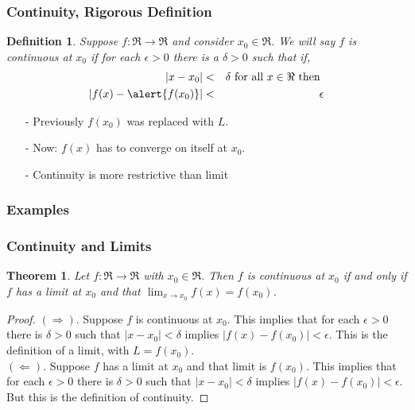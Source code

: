 \documentclass{beamer}
\newtheorem{thm}{Theorem}
\newtheorem{defn}{Definition}
\numberwithin{equation}{section}
\begin{document}
\begin{frame}
\frametitle{Continuity, Rigorous Definition} 

\begin{defn}
Suppose $f:\Re \rightarrow \Re$ and consider $x_{0} \in \Re$.  We will say $f$ is continuous at $x_{0}$ if for each $\epsilon>0$ there is a $\delta>0$ such that if, 
\begin{eqnarray}
|x - x_{0} | & < & \delta \text{ for all  } x \in \Re \text{ then } \nonumber \\
|f(x) - \alert{f(x_{0})}| & < & \epsilon \nonumber 
\end{eqnarray}
\end{defn}

\begin{itemize}
\item[-] Previously $f(x_{0})$ was replaced with $L$.  
\item[-] Now: $f(x)$ has to converge on itself at $x_{0}$.  
\item[-] Continuity is more restrictive than limit
\end{itemize}

\end{frame}

\begin{frame}
\frametitle{Examples}
\begin{center}
\end{center}
\end{frame}



\begin{frame}
\frametitle{Continuity and Limits}

\begin{thm} 
Let $f: \Re \rightarrow \Re$ with $x_{0} \in \Re$.  Then $f$ is continuous at $x_{0}$ if and only if $f$ has a limit at $x_{0}$ and that $\lim_{x \rightarrow x_{0} } f(x) = f(x_{0})$.  
\end{thm} 
\begin{proof}
$(\Rightarrow)$.  Suppose $f$ is continuous at $x_{0}$.  This implies that for each $\epsilon>0$ there is $\delta>0$ such that $|x - x_{0}|< \delta$ implies $|f(x) - f(x_{0}) |< \epsilon$.  This is the definition of a limit, with $L = f(x_{0})$.  \\
$(\Leftarrow)$.  Suppose $f$ has a limit at $x_{0}$ and that limit is $f(x_{0})$.  This implies that for each $\epsilon>0$ there is $\delta>0$ such that $|x - x_{0}|<\delta$ implies $|f(x) - f(x_{0})|< \epsilon $.  But this is the definition of continuity.
\end{proof}

\end{frame}
\end{document}
